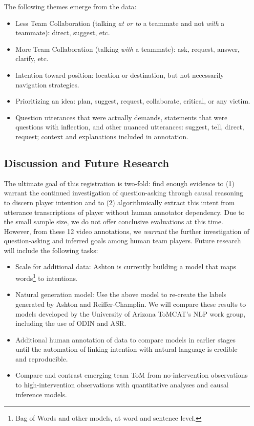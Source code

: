 The following themes emerge from the data:
\begin{itemize}
    \item Less Team Collaboration (talking \emph{at or to} a teammate and not \emph{with} a teammate): direct, suggest, etc.
    \item More Team Collaboration (talking \emph{with} a teammate): ask, request, answer, clarify, etc.
    \item Intention toward position: location or destination, but not necessarily navigation strategies.
    \item Prioritizing an idea: plan, suggest, request, collaborate, critical, or any victim.
    \item Question utterances that were actually demands, statements that were questions with inflection, and other nuanced utterances: suggest, tell, direct, request; context and explanations included in annotation.
\end{itemize}


\subsection{Discussion and Future Research}

The ultimate goal of this registration is two-fold: find enough evidence to (1) warrant the continued investigation of question-asking through causal reasoning to discern player intention and to (2) algorithmically extract this intent from utterance transcriptions of player without human annotator dependency. Due to the small sample size, we do not offer conclusive evaluations at this time. However, from these 12 video annotations, we \emph{warrant} the further investigation of question-asking and inferred goals among human team players.
\vspace{15pt}
Future research will include the following tasks:
\begin{itemize}
    \item Scale for additional data: Ashton is currently building a model that maps words\footnote{Bag of Words and other models, at word and sentence level.} to intentions.
    \item Natural generation model: Use the above model to re-create the labels generated by Ashton and Reiffer-Champlin. We will compare these results to models developed by the University of Arizona ToMCAT's NLP work group, including the use of ODIN and ASR.
    \item Additional human annotation of data to compare models in earlier stages until the automation of linking intention with natural language is credible and reproducible.
    \item Compare and contrast emerging team ToM from no-intervention observations to high-intervention observations with quantitative analyses and causal inference models.
\end{itemize}

